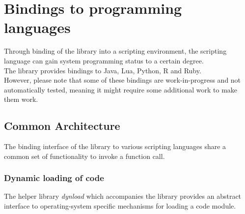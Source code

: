 %
%
%
%

\newpage
\section{Bindings to programming languages}

Through binding of the  library into a scripting environment,
the scripting language can gain system programming status to a certain degree.\\
The  library provides bindings to Java\cite{Java},
Lua\cite{Lua}, Python\cite{Python}, R\cite{R} and Ruby\cite{Ruby}.\\
However, please note that some of these bindings are work-in-progress and not
automatically tested, meaning it might require some additional work to make them
work.

\subsection{Common Architecture}

The binding interface of the  library to various scripting
languages share a common set of functionality to invoke a function call.

\subsubsection{Dynamic loading of code}

The helper library \emph{dynload} which accompanies the 
library provides an abstract interface to operating-system specific mechanisms
for loading a code module.

